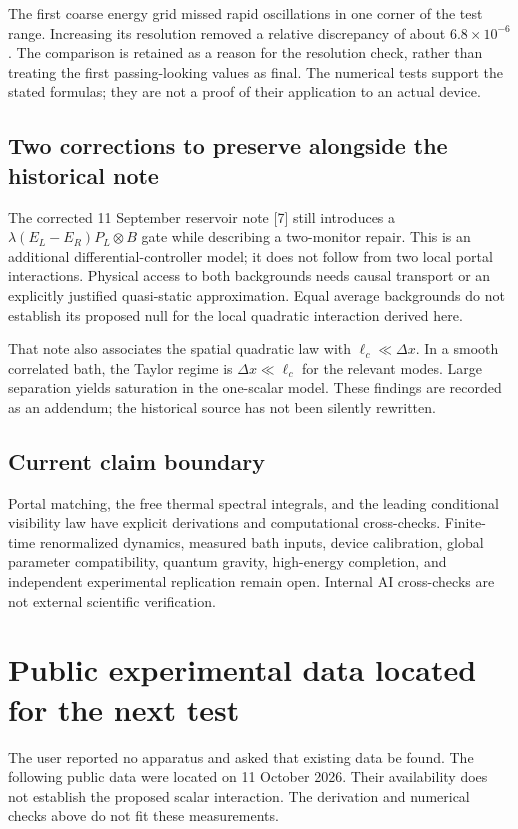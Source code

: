 \documentclass[11pt]{article}
\begin{document}
The first coarse energy grid missed rapid oscillations in one corner of the
test range. Increasing its resolution removed a relative discrepancy of
about $6.8\times10^{-6}$. The comparison is retained as a reason for the
resolution check, rather than treating the first passing-looking values as final.
The numerical tests support the stated formulas; they are not a proof of
their application to an actual device.

\subsection*{Two corrections to preserve alongside the historical note}
The corrected 11 September reservoir note [7] still introduces a
$\lambda(E_L-E_R)P_L\otimes B$ gate while describing a two-monitor repair.
This is an additional differential-controller model; it does not follow
from two local portal interactions. Physical access to both backgrounds
needs causal transport or an explicitly justified quasi-static approximation.
Equal average backgrounds do not establish its proposed null for the
local quadratic interaction derived here.

That note also associates the spatial quadratic law with
$\ell_c\ll\Delta x$. In a smooth correlated bath, the Taylor regime is
$\Delta x\ll\ell_c$ for the relevant modes. Large separation yields
saturation in the one-scalar model. These findings are recorded as an
addendum; the historical source has not been silently rewritten.

\subsection*{Current claim boundary}
Portal matching, the free thermal spectral integrals, and the leading
conditional visibility law have explicit derivations and computational
cross-checks. Finite-time renormalized dynamics, measured bath inputs,
device calibration, global parameter compatibility, quantum gravity,
high-energy completion, and independent experimental replication remain
open. Internal AI cross-checks are not external scientific verification.

\newpage
\section{Public experimental data located for the next test}
The user reported no apparatus and asked that existing data be found.
The following public data were located on 11 October 2026. Their availability
does not establish the proposed scalar interaction. The derivation and
numerical checks above do not fit these measurements.
\end{document}
